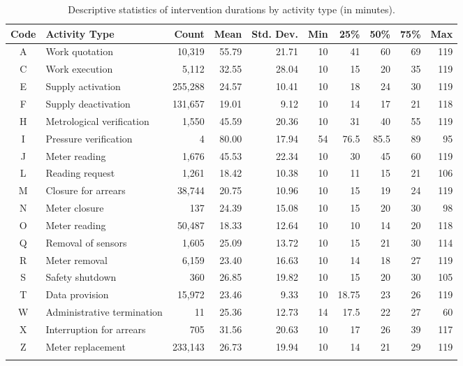 \documentclass[preprint,12pt]{elsarticle}
\begin{document}
\begin{longtable}{|c|l|r|r|r|r|r|r|r|r|}
\hline
\textbf{Code} & \textbf{Activity Type} & \textbf{Count} & \textbf{Mean} &
\textbf{Std. Dev.} & \textbf{Min} & \textbf{25\%} & \textbf{50\%} &
\textbf{75\%} & \textbf{Max} \\
\hline
A & Work quotation & 10,319 & 55.79 & 21.71 & 10 & 41 & 60 & 69 & 119 \\
C & Work execution & 5,112 & 32.55 & 28.04 & 10 & 15 & 20 & 35 & 119 \\
E & Supply activation & 255,288 & 24.57 & 10.41 & 10 & 18 & 24 & 30 & 119 \\
F & Supply deactivation & 131,657 & 19.01 & 9.12 & 10 & 14 & 17 & 21 & 118 \\
H & Metrological verification & 1,550 & 45.59 & 20.36 & 10 & 31 & 40 & 55 & 119 \\
I & Pressure verification & 4 & 80.00 & 17.94 & 54 & 76.5 & 85.5 & 89 & 95 \\
J & Meter reading & 1,676 & 45.53 & 22.34 & 10 & 30 & 45 & 60 & 119 \\
L & Reading request & 1,261 & 18.42 & 10.38 & 10 & 11 & 15 & 21 & 106 \\
M & Closure for arrears & 38,744 & 20.75 & 10.96 & 10 & 15 & 19 & 24 & 119 \\
N & Meter closure & 137 & 24.39 & 15.08 & 10 & 15 & 20 & 30 & 98 \\
O & Meter reading & 50,487 & 18.33 & 12.64 & 10 & 10 & 14 & 20 & 118 \\
Q & Removal of sensors & 1,605 & 25.09 & 13.72 & 10 & 15 & 21 & 30 & 114 \\
R & Meter removal & 6,159 & 23.40 & 16.63 & 10 & 14 & 18 & 27 & 119 \\
S & Safety shutdown & 360 & 26.85 & 19.82 & 10 & 15 & 20 & 30 & 105 \\
T & Data provision & 15,972 & 23.46 & 9.33 & 10 & 18.75 & 23 & 26 & 119 \\
W & Administrative termination & 11 & 25.36 & 12.73 & 14 & 17.5 & 22 & 27 & 60 \\
X & Interruption for arrears & 705 & 31.56 & 20.63 & 10 & 17 & 26 & 39 & 117 \\
Z & Meter replacement & 233,143 & 26.73 & 19.94 & 10 & 14 & 21 & 29 & 119 \\
\hline
\caption{Descriptive statistics of intervention durations by activity type (in minutes).}
\label{tab:activity_statistics}
\end{longtable}
\end{document}
